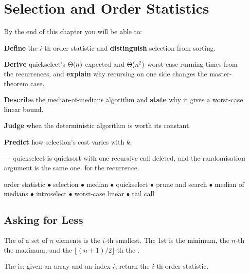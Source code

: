 \chapter{Selection and Order Statistics}\label{ch:selection}

\begin{outcomes}
By the end of this chapter you will be able to:
\begin{tight}
  \item \textbf{Define} the $i$-th order statistic and \textbf{distinguish}
        selection from sorting.
  \item \textbf{Derive} quickselect's $\Theta(n)$ expected and $\Theta(n^{2})$
        worst-case running times from the recurrences, and \textbf{explain} why
        recursing on one side changes the master-theorem case.
  \item \textbf{Describe} the median-of-medians algorithm and \textbf{state}
        why it gives a worst-case linear bound.
  \item \textbf{Judge} when the deterministic algorithm is worth its constant.
  \item \textbf{Predict} how selection's cost varies with $k$.
\end{tight}
\end{outcomes}

\begin{prereq}
 --- quickselect is quicksort with one recursive call deleted,
and the randomisation argument is the same one.  for the
recurrence.
\end{prereq}

\begin{keyterms}
order statistic $\bullet$ selection $\bullet$ median $\bullet$ quickselect
$\bullet$ prune and search $\bullet$ median of medians $\bullet$ introselect
$\bullet$ worst-case linear $\bullet$ tail call
\end{keyterms}

\section{Asking for Less}

\begin{definitionbox}
The  of a set of $n$ elements is the $i$-th
smallest. The 1st is the minimum, the $n$-th the maximum, and the
$\lfloor (n+1)/2 \rfloor$-th the .

\smallskip
The  is: given an array and an index $i$, return the
$i$-th order statistic.
\end{definitionbox}

